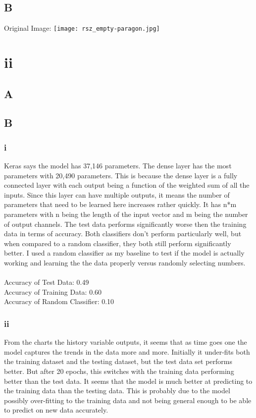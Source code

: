 \documentclass[11pt]{article} %
\begin{document}
\subsection{B}
Original Image: \texttt{[image: rsz\_empty-paragon.jpg]}
\section{ii}
\subsection{A}
\subsection{B}
\subsubsection{i}
Keras says the model has 37,146 parameters.  The dense layer has the most parameters with 20,490 parameters.  This is because the dense layer is a fully connected layer with each output being a function of the weighted sum of all the inputs. Since this layer can have multiple outputs, it means the number of parameters that need to be learned here increases rather quickly.  It has n*m parameters with n being the length of the input vector and m being the number of output channels. The test data performs significantly worse then the training data in terms of accuracy.  Both classifiers don't perform particularly well,  but when compared to a random classifier, they both still perform significantly better.  I used a random classifier as my baseline to test if the model is actually working and learning the the data properly versus randomly selecting numbers.
\\\\ Accuracy of Test Data: 0.49
\\ Accuracy of Training Data: 0.60
\\ Accuracy of Random Classifier: 0.10
\subsubsection{ii}
From the charts the history variable outputs, it seems that as time goes one the model captures the trends in the data more and more.  Initially it under-fits both the training dataset and the testing dataset, but the test data set performs better.  But after 20 epochs, this switches with the training data performing better than the test data. It seems that the model is much better at predicting to the training data than the testing data.  This is probably due to the model possibly over-fitting to the training data and not being general enough to be able to predict on new data accurately.
\end{document}
